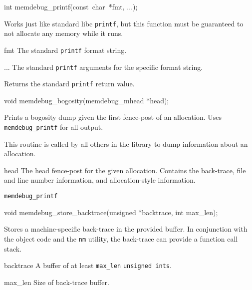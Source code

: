 \begin{apisyn}

	\funcproto int
	memdebug_printf(const~char~*fmt, ...);
\end{apisyn}
\begin{apidesc}
	Works just like standard libc {\tt printf}, but this
	function must be guaranteed to not allocate any memory
	while it runs.
\end{apidesc}
\begin{apiparm}
	\item[fmt] 
		The standard {\tt printf} format string.
	\item[...]
		The standard {\tt printf} arguments for the specific
		format string.
\end{apiparm}
\begin{apiret}
	Returns the standard {\tt printf} return value.
\end{apiret}


\begin{apisyn}

	\funcproto void
	memdebug_bogosity(memdebug_mhead *head);
\end{apisyn}
\begin{apidesc}
	Prints a bogosity dump given the first fence-post of an
	allocation.  Uses {\tt memdebug_printf} for all output.
	
	This routine is called by all others in the library to
	dump information about an allocation.
\end{apidesc}
\begin{apiparm}
	\item[head]
		The head fence-post for the given allocation.
		Contains the back-trace, file and line number
		information, and allocation-style information.
\end{apiparm}
\begin{apirel}
	{\tt memdebug_printf}
\end{apirel}


\begin{apisyn}

	\funcproto void
	memdebug_store_backtrace(unsigned *backtrace, int max_len);
\end{apisyn}
\begin{apidesc}
	Stores a machine-specific back-trace in the provided buffer.
	In conjunction with the object code and the {\tt nm} utility,
	the back-trace can provide a function call stack.
\end{apidesc}
\begin{apiparm}
	\item[backtrace]
		A buffer of at least {\tt max_len} \texttt{unsigned ints}.
	\item[max_len]
		Size of back-trace buffer.
\end{apiparm}

